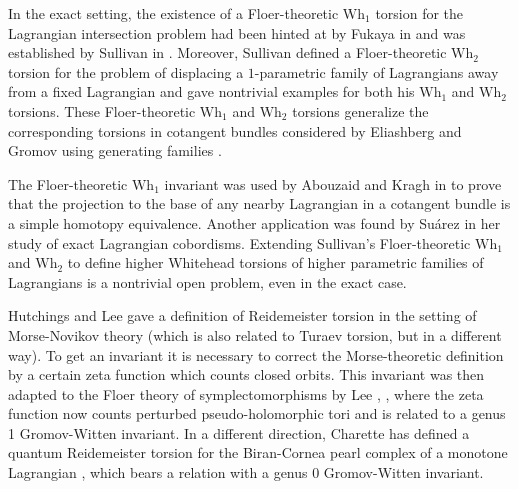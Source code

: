 \documentclass[11pt]{article}
\numberwithin{equation}{section}\providecommand{\dpl}{\displaystyle}
\newcommand{\Wh}{\mathrm{Wh}}
\theoremstyle{plain}
\theoremstyle{definition}
\begin{document}
In the exact setting, the existence of a Floer-theoretic $\Wh_1$ torsion for the Lagran\-gian intersection problem had been hinted at by Fukaya in \cite{F95} and was established by Sullivan in \cite{S02}. Moreover, Sullivan defined a Floer-theoretic $\Wh_2$ torsion for the problem of displacing a $1$-parametric family of Lagrangians away from a fixed Lagrangian and gave nontrivial examples for both his $\Wh_1$ and $\Wh_2$ torsions. These Floer-theoretic $\Wh_1$ and $\Wh_2$ torsions generalize the corresponding torsions in cotangent bundles considered by Eliashberg and Gromov using generating families \cite{EG98}.

The Floer-theoretic $\Wh_1$ invariant was used by Abouzaid and Kragh in \cite{AK18} to prove that the projection to the base of any nearby Lagrangian in a cotangent bundle is a simple homotopy equivalence. Another application was found by Suárez \cite{S17} in her study of exact Lagrangian cobordisms. Extending Sullivan's Floer-theoretic $\Wh_1$ and $\Wh_2$ to define higher Whitehead torsions of higher parametric families of Lagrangians is a nontrivial open problem, even in the exact case.

Hutchings and Lee gave a definition of Reidemeister torsion in the setting of Morse-Novikov theory \cite{HL99} (which is also related to Turaev torsion, but in a different way). To get an invariant it is necessary to correct the Morse-theoretic definition by a certain zeta function which counts closed orbits. This invariant was then adapted to the Floer theory of symplectomorphisms by Lee \cite{L05a}, \cite{L05b}, where the zeta function now counts perturbed pseudo-holomorphic tori and is related to a genus 1 Gromov-Witten invariant. In a different direction, Charette has defined a quantum Reidemeister torsion for the Biran-Cornea pearl complex of a monotone Lagrangian \cite{C17}, which bears a relation with a genus 0 Gromov-Witten invariant.


\end{document}
